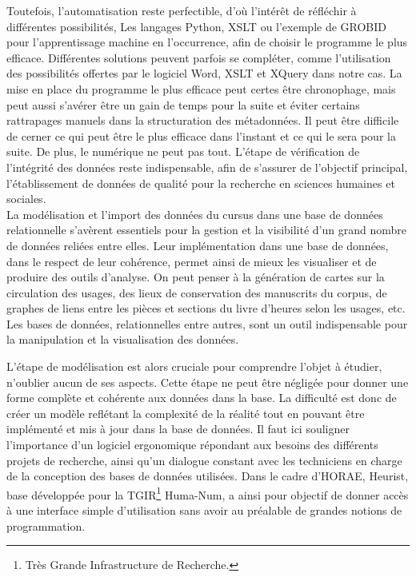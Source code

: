 \documentclass[a4paper,12pt,twoside]{book}
\begin{document}
	Toutefois, l'automatisation reste perfectible, d'où l'intérêt de réfléchir à différentes possibilités, Les langages Python, XSLT ou l'exemple de GROBID pour l'apprentissage machine en l'occurrence, afin de choisir le programme le plus efficace. Différentes solutions peuvent parfois se compléter, comme l'utilisation des possibilités offertes par le logiciel Word, XSLT et XQuery dans notre cas. La mise en place du programme le plus efficace peut certes être chronophage, mais peut aussi s'avérer être un gain de temps pour la suite et éviter certains rattrapages manuels dans la structuration des métadonnées. Il peut être difficile de cerner ce qui peut être le plus efficace dans l'instant et ce qui le sera pour la suite. De plus, le numérique ne peut pas tout. L'étape de vérification de l'intégrité des données reste indispensable, afin de s'assurer de l'objectif principal, l'établissement de données de qualité pour la recherche en sciences humaines et sociales. \\
	
	La modélisation et l'import des données du cursus dans une base de données relationnelle s'avèrent essentiels pour la gestion et la visibilité d'un grand nombre de données reliées entre elles. Leur implémentation dans une base de données, dans le respect de leur cohérence, permet ainsi de mieux les visualiser et de produire des outils d'analyse. On peut penser à la génération de cartes sur la circulation des usages, des lieux de conservation des manuscrits du corpus, de graphes de liens entre les pièces et sections du livre d'heures selon les usages, etc. Les bases de données, relationnelles entre autres, sont un outil indispensable pour la manipulation et la visualisation des données. 
	
	L'étape de modélisation est alors cruciale pour comprendre l'objet à étudier, n'oublier aucun de ses aspects. Cette étape ne peut être négligée pour donner une forme complète et cohérente aux données dans la base. La difficulté est donc de créer un modèle reflétant la complexité de la réalité tout en pouvant être implémenté et mis à jour dans la base de données. Il faut ici souligner l'importance d'un logiciel ergonomique répondant aux besoins des différents projets de recherche, ainsi qu'un dialogue constant avec les techniciens en charge de la conception des bases de données utilisées. Dans le cadre d'HORAE, Heurist, base développée pour la TGIR\footnote{Très Grande Infrastructure de Recherche.} Huma-Num, a ainsi pour objectif de donner accès à une interface simple d'utilisation sans avoir au préalable de grandes notions de programmation. \\
	
\end{document}
